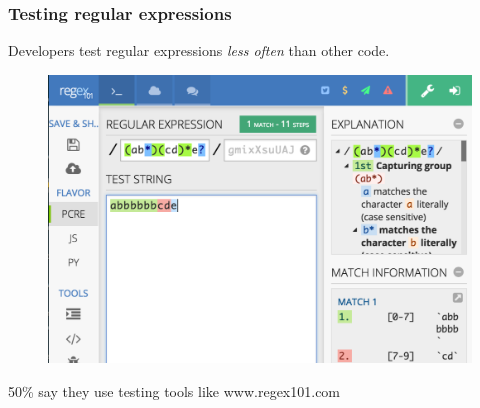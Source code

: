 
\begin{frame}
\frametitle{Testing regular expressions}
Developers test regular expressions \emph{less often} than other code.
%
\begin{figure}[ht]
  \includegraphics[scale=0.35]{nontex/regex101}
  \label{fig:regex101}
\end{figure}
\begin{center}
50\% say they use testing tools like www.regex101.com
\end{center}
\end{frame}




